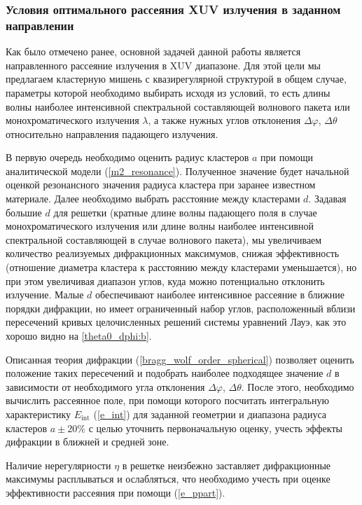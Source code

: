 \subsubsection{Условия оптимального рассеяния XUV излучения в заданном направлении}

Как было отмечено ранее, основной задачей данной работы является направленного рассеяние излучения в XUV диапазоне. Для этой цели мы предлагаем кластерную мишень с квазирегулярной структурой в общем случае, параметры которой необходимо выбирать исходя из условий, то есть длины волны наиболее интенсивной спектральной составляющей волнового пакета или монохроматического излучения $\lambda$, а также нужных углов отклонения $\Delta \varphi$, $\Delta \theta$ относительно направления падающего излучения. 

В первую очередь необходимо оценить радиус кластеров $a$ при помощи аналитической модели (\ref{m2_resonance}). Полученное значение будет начальной оценкой резонансного значения радиуса кластера при заранее известном материале. Далее необходимо выбрать расстояние между кластерами $d$. Задавая большие $d$ для решетки (кратные длине волны падающего поля в случае монохроматического излучения или длине волны наиболее интенсивной спектральной составляющей в случае волнового пакета), мы увеличиваем количество реализуемых дифракционных максимумов, снижая эффективность (отношение диаметра кластера к расстоянию между кластерами уменьшается), но при этом увеличивая диапазон углов, куда можно потенциально отклонить излучение. Малые $d$ обеспечивают наиболее интенсивное рассеяние в ближние порядки дифракции, но имеет ограниченный набор углов, расположенный вблизи пересечений кривых целочисленных решений системы уравнений Лауэ, как это хорошо видно на \autoref{theta0_dphi:b}. 

Описанная теория дифракции (\ref{bragg_wolf_order_spherical}) позволяет оценить положение таких пересечений и подобрать наиболее подходящее значение $d$ в зависимости от необходимого угла отклонения $\Delta \varphi$, $\Delta \theta$. После этого, необходимо вычислить рассеянное поле, при помощи которого посчитать интегральную характеристику $E_{\textrm{int}}$ (\ref{e_int}) для заданной геометрии и диапазона радиуса кластеров $a\pm20\%$ с целью уточнить первоначальную оценку, учесть эффекты дифракции в ближней и средней зоне.

Наличие нерегулярности $\eta$ в решетке неизбежно заставляет дифракционные максимумы расплываться и ослабляться, что необходимо учесть при оценке эффективности рассеяния при помощи (\ref{e_ppart}).